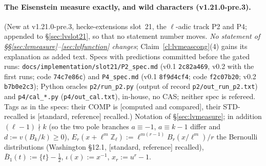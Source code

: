 \documentclass[11pt]{article}
\theoremstyle{remark}
\newcommand{\Z}{\mathbb{Z}}
\newcommand{\STD}{\textsf{[standard, reference]}}
\newcommand{\CMPD}{\textsf{[computed and compared]}}   %
\begin{document}
\paragraph{The Eisenstein measure exactly, and wild characters (v1.21.0-pre.3).} (New at v1.21.0-pre.3, hecke-extensions slot~21, the $\ell$-adic track P2 and P4; appended to
\S\ref{sec:lvslot21}, so that no statement number moves. \emph{No statement of \S\S\ref{sec:lvmeasure}--\ref{sec:lvlfunction} changes}; Claim~\ref{cl:lvmeascong}(4) gains its explanation as added
text. Specs with predictions committed before the gated runs: \texttt{docs/implementation/slot21/P2\_spec.md} (v0.1 \texttt{2c82a469}, v0.2 with the first runs; code \texttt{74c7e86c}) and
\texttt{P4\_spec.md} (v0.1 \texttt{8f9d4cf4}; code \texttt{f2c07b20}; v0.2 \texttt{b7b0e2c3}); Python oracles \texttt{p2/run\_p2.py} (output of record \texttt{p2/out\_run\_p2.txt}) and
\texttt{p4/cal\_*.py} (\texttt{p4/out\_cal.txt}), in-house, no CAS; neither spec is refereed. Tags as in the specs: their COMP is \CMPD, their STD-recalled is \STD{} recalled.)
Notation of \S\ref{sec:lvmeasure}; in addition $(\ell-1)\nmid k$ (so the two pole branches $a\equiv-1$, $a\equiv k-1$ differ and $d:=v(B_k/k)\ge0$), $E_r(x+\ell^{m}\Z_\ell):=\ell^{m(r-1)}B_r(x/\ell^{m})/r$
the Bernoulli distributions (Washington \S12.1, \STD{} recalled), $\bar B_1(t):=\{t\}-\tfrac12$, $\iota(x):=x^{-1}$, $x_r:=u^{r}-1$.
\end{document}
